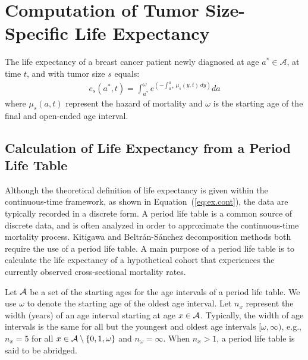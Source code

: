 \documentclass[11pt,letterpaper]{article}
\theoremstyle{plain}
\begin{document}
\section{Computation of Tumor Size-Specific Life Expectancy}
The life expectancy of a breast cancer patient newly diagnosed at age
$a^*\in\mathcal{A}$, at time $t$, and with tumor size $s$ equals:
\begin{eqnarray}
 e_s(a^*,t)=\int_{a^*}^{\omega} e^{\left( -\int_{a*}^{a}\mu_s(y,t)\,dy \right)}da %
\label{eq:ex.cont}
\end{eqnarray} 
where $\mu_s(a,t)$ %
represent the hazard of mortality
and $\omega$ is the starting age of
the final and open-ended age interval.

\subsection{Calculation of Life Expectancy from a Period Life Table}
\label{subsec:period_lifetable}
 Although the theoretical definition of life
expectancy is given within the continuous-time framework, as shown in
Equation~(\ref{eq:ex.cont}), the data are typically recorded in a
discrete form.  A period life table is a common source of discrete
data, and is often analyzed in order to approximate the
continuous-time mortality process. Kitigawa and
Beltr\'{a}n-S\'{a}nchez decomposition methods both require the use of
a period life table. A main purpose of a period life table is to
calculate the life expectancy of a hypothetical cohort that
experiences the currently observed cross-sectional mortality rates.

Let $\mathcal{A}$ be a set of the starting ages for the age intervals of a
period life table. We use $\omega$ to denote the starting age of the
oldest age interval. Let $n_x$ represent the width (years) of an age
interval starting at age $x \in \mathcal{A}$. Typically, the width of age
intervals is the same for all but the youngest and oldest age intervals $[\omega,
\infty)$, e.g., $n_x=5$ for all $x \in \mathcal{A} \setminus \{0,1,\omega\}$ and
$n_\omega=\infty$.  When $n_x>1$, a period life table is said to be
abridged.
\end{document}
